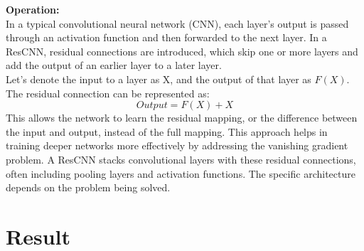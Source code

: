 \documentclass{ieeeojies}
\begin{document}
\textbf{Operation:}\\
In a typical convolutional neural network (CNN), each layer's output is passed through an activation function and then forwarded to the next layer. In a ResCNN, residual connections are introduced, which skip one or more layers and add the output of an earlier layer to a later layer.\\
Let's denote the input to a layer as X, and the output of that layer as \(F(X)\). The residual connection can be represented as:\\
    \[Output=F(X)+X\]
This allows the network to learn the residual mapping, or the difference between the input and output, instead of the full mapping. This approach helps in training deeper networks more effectively by addressing the vanishing gradient problem. A ResCNN stacks convolutional layers with these residual connections, often including pooling layers and activation functions. The specific architecture depends on the problem being solved.\\

\section{Result}
\end{document}
